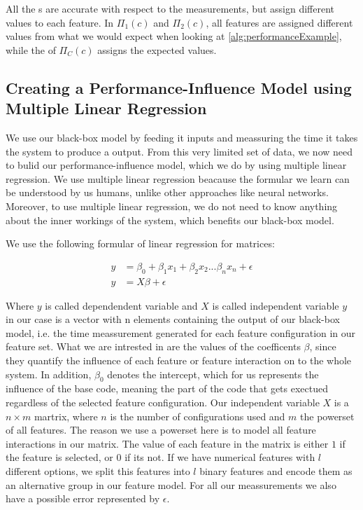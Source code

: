 All the {\perfInfluenceModel}s are accurate with respect to the measurements, but assign different values to each feature. 
In $\Pi_1(c)$ and $\Pi_2(c)$, all features are assigned different values from what we would expect when looking at \ref{alg:performanceExample},
while the \perfInfluenceModel of $\Pi_C(c)$ assigns the expected values.

\subsection{Creating a Performance-Influence Model using Multiple Linear Regression}
We use our black-box model by feeding it inputs and meassuring the time it takes the system to produce a output. From this 
very limited set of data, we now need to bulid our performance-influence model, which we do by using multiple linear regression.
We use multiple linear regression beacause the formular we learn can be understood by us humans, unlike other approaches like neural networks.
Moreover, to use multiple linear regression, we do not need to know anything about the inner workings of the system,
which benefits our black-box model. \cite{Linear-Regression-Performance}

We use the following formular of linear regression for matrices\cite{Linear-Regression-Performance}:

\begin{align*}
        y &= \beta_0 + \beta_1 x_1 + \beta_2 x_2 ... \beta_n x_n + \epsilon   \\
        y &= X \beta + \epsilon
\end{align*}


Where $y$ is called dependendent variable and $X$ is called independent variable $y$ in our case is a vector with n elements containing
the output of our black-box model, i.e. the time meassurement generated for each feature configuration in our feature set. What we
are intrested in are the values of the coefficents $\beta$, since they quantify the influence of each feature or feature interaction
on to the whole system. In addition, $\beta_0$ denotes the intercept, which for us represents the influence of the base code, meaning
the part of the code that gets exectued regardless of the selected feature configuration.
Our independent variable $X$ is a $n \times m$ martrix, where $n$ is the number of configurations used and $m$ the powerset of all
features. The reason we use a powerset here is to model all feature interactions in our matrix.
The value of each feature in the matrix is either $1$ if the feature is selected, or $0$ if its not. If we have numerical features with $l$
different options, we split this features into $l$ binary features and encode them as an alternative group in our feature model.
For all our meassurements we also have a possible error represented by $\epsilon$. \cite{Linear-Regression}


